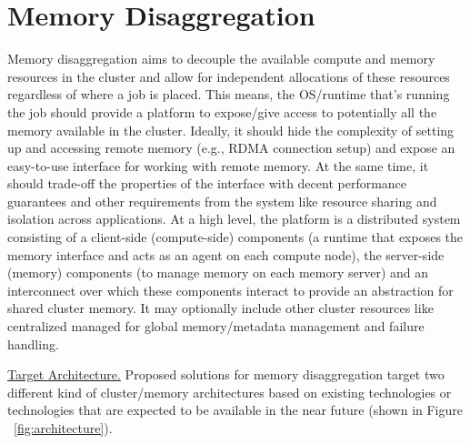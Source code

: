 \section{Memory Disaggregation}

Memory disaggregation aims to decouple the available compute 
and memory resources in the cluster and allow for independent 
allocations of these resources regardless of where a job 
is placed. This means, the OS/runtime 
that's running the job should provide a platform to 
expose/give access to potentially all the memory 
available in the cluster. Ideally, it should hide the 
complexity of setting up and accessing remote memory 
(e.g., RDMA connection setup) and 
expose an easy-to-use interface for working with remote memory.
At the same time, it should trade-off the properties 
of the interface with decent performance guarantees 
and other requirements from the system like resource 
sharing and isolation across applications. At a high 
level, the platform is a distributed system consisting 
of a client-side (compute-side) components (a runtime 
that exposes the memory interface and acts as an agent 
on each compute node), the server-side (memory) components 
(to manage memory on each memory server) and an 
interconnect over which these components interact to 
provide an abstraction for shared cluster memory.
It may optionally include other cluster resources like
centralized managed for global memory/metadata management
and failure handling.

\vspace{3pt}
\noindent \uline{Target Architecture.}
Proposed solutions for memory disaggregation target two 
different kind of cluster/memory architectures based on
existing technologies or technologies that are expected
to be available in the near future (shown in 
Figure ~\ref{fig:architecture}).

